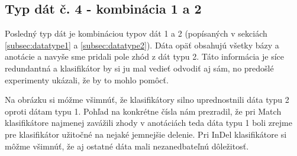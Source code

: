 
\subsection{Typ dát č. 4 - kombinácia 1 a 2}

Posledný typ dát je kombináciou typov dát 1 a 2 (popísaných v sekciách \ref{subsec:datatype1} a \ref{subsec:datatype2}). Dáta opäť obsahujú všetky bázy a anotácie a navyše sme pridali pole zhód z dát typu 2. Táto informácia je síce redundantná a klasifikátor by si ju mal vedieť odvodiť aj sám, no predošlé experimenty ukázali, že by to mohlo pomôcť.

Na obrázku \label{fig:datatype4} si móžme všimnúť, že klasifikátory silno uprednostnili dáta typu 2 oproti dátam typu 1. Pohľad na konkrétne čísla nám prezradil, že pri Match klasifikátore najmenej zavážili zhody v anotáciách teda dáta typu 1 boli zrejme pre klasifikátor užitočné na nejaké jemnejšie delenie.
Pri InDel klasifikátore si môžme všimnúť, že aj ostatné dáta mali nezanedbateľnú dôležitosť.

